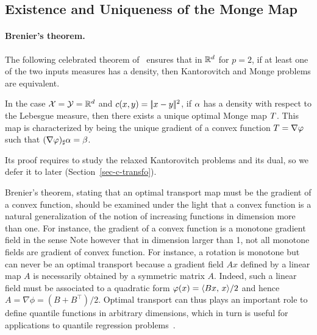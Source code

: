\subsection{Existence and Uniqueness of the Monge Map}

\paragraph{Brenier's theorem.}

The following celebrated theorem of~\cite{Brenier91} ensures that in $\mathbb{R}^d$ for $p=2$, if at least one of the two inputs measures has a density, then Kantorovitch and Monge problems are equivalent.

\begin{thm}[Brenier]\label{thm-brenier}
	In the case $\mathcal{X}=\mathcal{Y}=\mathbb{R}^d$ and $c(x,y)=|\!| x-y |\!|^2$, if $\alpha$ has a density with respect to the Lebesgue measure, then there exists a unique optimal Monge map $T$. This map is characterized by being the unique gradient of a convex function $T=\nabla \varphi$ such that $(\nabla \varphi)_\sharp \alpha = \beta$. 
\end{thm}

Its proof requires to study the relaxed Kantorovitch problems and its dual, so we defer it to later (Section~\ref{sec-c-transfo}). 


%
Brenier's theorem, stating that an optimal transport map must be the gradient of a convex function, should be examined under the light that a convex function is a natural generalization of the notion of increasing functions in dimension more than one. 
%
For instance, the gradient of a convex function is a monotone gradient field in the sense
Note however that in dimension larger than 1, not all monotone fields are gradient of convex function. For instance, a rotation is monotone but can never be an optimal transport because a gradient field $Ax$ defined by a linear map $A$ is necessarily obtained by a symmetric matrix $A$. Indeed, such a linear field must be associated to a quadratic form $\varphi(x)=\langle Bx,\,x\rangle/2$
and hence $A=\nabla \phi = (B+B^\top)/2$.
%
Optimal transport can thus plays an important role to define quantile functions in arbitrary dimensions, which in turn is useful for applications to quantile regression problems~\cite{carlier2016vector}.
 

